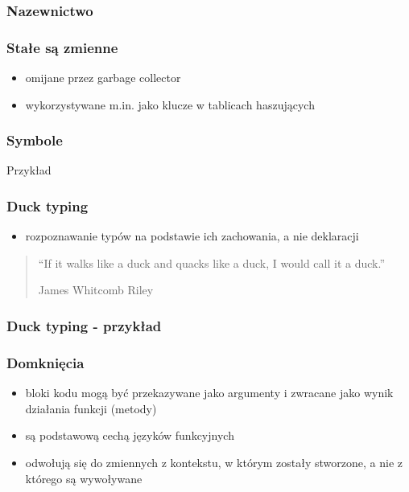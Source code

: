 \documentclass[12t]{beamer}
\begin{document}
\begin{frame}
  \frametitle{Nazewnictwo}
  \begin{small}
    
  \end{small}
\end{frame}

\begin{frame}
  \frametitle{Stałe są zmienne}
  
\end{frame}

\begin{frame}
  \begin{itemize}
  \item omijane przez garbage collector
  \item wykorzystywane m.in. jako klucze w tablicach haszujących
  \end{itemize}
  \frametitle{Symbole}
  \begin{block}{Przykład}
    
  \end{block}
\end{frame}

\begin{frame}
  \frametitle{Duck typing}
  \begin{itemize}
  \item rozpoznawanie typów na podstawie ich zachowania, a nie deklaracji
  \end{itemize}
\end{frame}

\begin{frame}
  \begin{quote}
    “If it walks like a duck and quacks like a duck, I would call it a
    duck.”

    \hfill James Whitcomb Riley
  \end{quote}
\end{frame}

\begin{frame}
  \frametitle{Duck typing - przykład}
 \begin{small}
    
  \end{small}
\end{frame}

\begin{frame}
  \frametitle{Domknięcia}
  \begin{itemize}
  \item bloki kodu mogą być przekazywane jako argumenty i zwracane
    jako wynik działania funkcji (metody)
  \item są podstawową cechą języków funkcyjnych
  \item odwołują się do zmiennych z kontekstu, w którym zostały
    stworzone, a nie z którego są wywoływane
  \end{itemize}
\end{frame}
\end{document}
